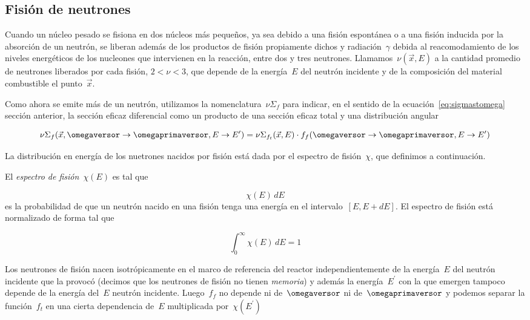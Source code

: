\subsection{Fisión de neutrones} %
\label{sec:fision}

Cuando un núcleo pesado se fisiona en dos núcleos más pequeños, ya sea debido a una fisión espontánea o a una fisión inducida por la absorción de un neutrón, se liberan además de los productos de fisión propiamente dichos y radiación~$\gamma$ debida al reacomodamiento de los niveles energéticos de los nucleones que intervienen en la reacción, entre dos y tres neutrones. Llamamos~$\nu(\vec{x}, E)$ a la cantidad promedio de neutrones liberados por cada fisión, $2 < \nu < 3$, que depende de la energía~$E$ del neutrón incidente y de la composición del material combustible  el punto~$\vec{x}$.

Como ahora se emite más de un neutrón, utilizamos la nomenclatura~$\nu\Sigma_f$ para indicar, en el sentido de la ecuación~\eqref{eq:sigmastomega} sección anterior, la sección eficaz diferencial como un producto de una sección eficaz total y una distribución angular

\begin{equation*}
 \nu\Sigma_f(\vec{x}, \omegaversor \rightarrow \omegaprimaversor, E \rightarrow E^\prime) = \nu\Sigma_{f_t}(\vec{x}, E) \cdot f_f(\omegaversor \rightarrow \omegaprimaversor, E \rightarrow E^\prime)
\end{equation*}

La distribución en energía de los nuetrones nacidos por fisión está dada por el espectro de fisión~$\chi$, que definimos a continuación.

\begin{definicion}
\label{def:chi}
El \emph{espectro de fisión}~$\chi(E)$ es tal que

\begin{equation*}
\chi(E) \, dE
\end{equation*}
%
es la probabilidad de que un neutrón nacido en una fisión tenga una energía en el intervalo~$[E,E+dE]$. El espectro de fisión está normalizado de forma tal que

\begin{equation}\label{eq:chinorm}
 \int_{0}^{\infty} \chi(E) \, dE = 1
\end{equation}
\end{definicion}

Los neutrones de fisión nacen isotrópicamente en el marco de referencia del reactor independientemente de la energía~$E$ del neutrón incidente que la provocó (decimos que los neutrones de fisión no tienen \emph{memoria}) y además la energía~$E^\prime$ con la que emergen tampoco depende de la energía del~$E$ neutrón incidente. Luego~$f_f$ no depende ni de~$\omegaversor$ ni de~$\omegaprimaversor$ y podemos separar la función~$f_t$ en una cierta dependencia de~$E$ multiplicada por~$\chi(E^\prime)$

